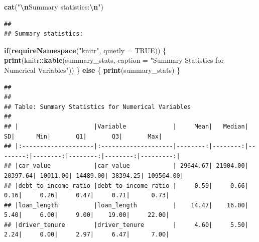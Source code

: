 \documentclass[
]{article}
\newenvironment{Shaded}{\begin{snugshade}}{\end{snugshade}}
\newcommand{\AttributeTok}[1]{\textcolor[rgb]{0.13,0.29,0.53}{#1}}
\newcommand{\ConstantTok}[1]{\textcolor[rgb]{0.56,0.35,0.01}{#1}}
\newcommand{\ControlFlowTok}[1]{\textcolor[rgb]{0.13,0.29,0.53}{\textbf{#1}}}
\newcommand{\FunctionTok}[1]{\textcolor[rgb]{0.13,0.29,0.53}{\textbf{#1}}}
\newcommand{\NormalTok}[1]{#1}
\newcommand{\SpecialCharTok}[1]{\textcolor[rgb]{0.81,0.36,0.00}{\textbf{#1}}}
\newcommand{\StringTok}[1]{\textcolor[rgb]{0.31,0.60,0.02}{#1}}
\begin{document}
\begin{Shaded}
\begin{Highlighting}[]
\FunctionTok{cat}\NormalTok{(}\StringTok{"}\SpecialCharTok{\textbackslash{}n}\StringTok{Summary statistics:}\SpecialCharTok{\textbackslash{}n}\StringTok{"}\NormalTok{)}
\end{Highlighting}
\end{Shaded}

\begin{verbatim}
## 
## Summary statistics:
\end{verbatim}

\begin{Shaded}
\begin{Highlighting}[]
\ControlFlowTok{if}\NormalTok{(}\FunctionTok{requireNamespace}\NormalTok{(}\StringTok{"knitr"}\NormalTok{, }\AttributeTok{quietly =} \ConstantTok{TRUE}\NormalTok{)) \{}
  \FunctionTok{print}\NormalTok{(knitr}\SpecialCharTok{::}\FunctionTok{kable}\NormalTok{(summary\_stats, }\AttributeTok{caption =} \StringTok{"Summary Statistics for Numerical Variables"}\NormalTok{))}
\NormalTok{\} }\ControlFlowTok{else}\NormalTok{ \{}
  \FunctionTok{print}\NormalTok{(summary\_stats)}
\NormalTok{\}}
\end{Highlighting}
\end{Shaded}

\begin{verbatim}
## 
## 
## Table: Summary Statistics for Numerical Variables
## 
## |                     |Variable             |     Mean|   Median|       SD|      Min|       Q1|       Q3|       Max|
## |:--------------------|:--------------------|--------:|--------:|--------:|--------:|--------:|--------:|---------:|
## |car_value            |car_value            | 29644.67| 21904.00| 20397.64| 10011.00| 14489.00| 38394.25| 109564.00|
## |debt_to_income_ratio |debt_to_income_ratio |     0.59|     0.66|     0.16|     0.26|     0.47|     0.71|      0.73|
## |loan_length          |loan_length          |    14.47|    16.00|     5.40|     6.00|     9.00|    19.00|     22.00|
## |driver_tenure        |driver_tenure        |     4.60|     5.50|     2.24|     0.00|     2.97|     6.47|      7.00|
\end{verbatim}
\end{document}
